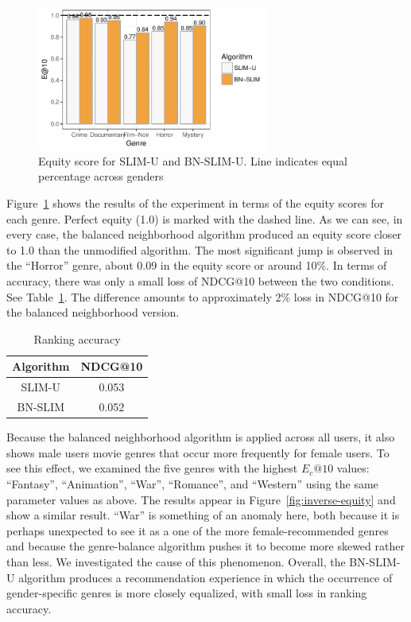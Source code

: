 \begin{figure}[tbh]
    \centering
    \includegraphics[width=3.00in]{imgs/bln/genre-compare3.pdf}
    \caption{Equity score for SLIM-U and BN-SLIM-U. Line indicates equal percentage across genders}
    \label{fig:genre}
\end{figure}

Figure~\ref{fig:genre} shows the results of the experiment in terms of the equity scores for each genre. Perfect equity (1.0) is marked with the dashed line. As we can see, in every case, the balanced neighborhood algorithm produced an equity score closer to 1.0 than the unmodified algorithm. The most significant jump is observed in the ``Horror'' genre, about 0.09 in the equity score or around 10\%. In terms of accuracy, there was only a small loss of NDCG@10 between the two conditions. See Table~\ref{tab:ndcg}. The difference amounts to approximately 2\% loss in NDCG@10 for the balanced neighborhood version.

\begin{table}
\centering
\begin{tabular}{c|c}
    Algorithm &  NDCG@10 \\ \hline
    SLIM-U & 0.053 \\ \hline
    BN-SLIM & 0.052 \\ \hline
\end{tabular}
\caption{Ranking accuracy}
\label{tab:ndcg}
\end{table}

Because the balanced neighborhood algorithm is applied across all users, it also shows male users movie genres that occur more frequently for female users. To see this effect, we examined the five genres with the highest $E_c@10$ values: ``Fantasy'', ``Animation'', ``War'', ``Romance'', and ``Western'' using the same parameter values as above. The results appear in Figure~\ref{fig:inverse-equity} and show a similar result. ``War'' is something of an anomaly here, both because it is perhaps unexpected to see it as a one of the more female-recommended genres and because the genre-balance algorithm pushes it to become more skewed rather than less. We investigated the cause of this phenomenon. Overall, the BN-SLIM-U algorithm produces a recommendation experience in which the occurrence of gender-specific genres is more closely equalized, with small loss in ranking accuracy.

